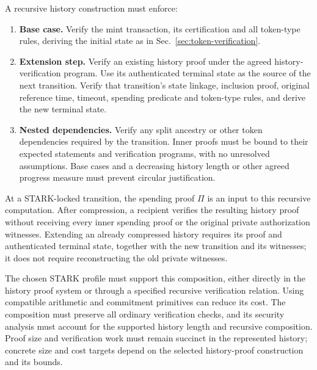 A recursive history construction must enforce:
\begin{enumerate}
  \item \textbf{Base case.} Verify the mint transaction, its certification and all token-type rules, deriving the initial state as in Sec.~\ref{sec:token-verification}.
  \item \textbf{Extension step.} Verify an existing history proof under the agreed history-verification program. Use its authenticated terminal state as the source of the next transition. Verify that transition's state linkage, inclusion proof, original reference time, timeout, spending predicate and token-type rules, and derive the new terminal state.
  \item \textbf{Nested dependencies.} Verify any split ancestry or other token dependencies required by the transition. Inner proofs must be bound to their expected statements and verification programs, with no unresolved assumptions. Base cases and a decreasing history length or other agreed progress measure must prevent circular justification.
\end{enumerate}
At a STARK-locked transition, the spending proof $\Pi$ is an input to this recursive computation. After compression, a recipient verifies the resulting history proof without receiving every inner spending proof or the original private authorization witnesses. Extending an already compressed history requires its proof and authenticated terminal state, together with the new transition and its witnesses; it does not require reconstructing the old private witnesses.

The chosen STARK profile must support this composition, either directly in the history proof system or through a specified recursive verification relation. Using compatible arithmetic and commitment primitives can reduce its cost. The composition must preserve all ordinary verification checks, and its security analysis must account for the supported history length and recursive composition. Proof size and verification work must remain succinct in the represented history; concrete size and cost targets depend on the selected history-proof construction and its bounds.

